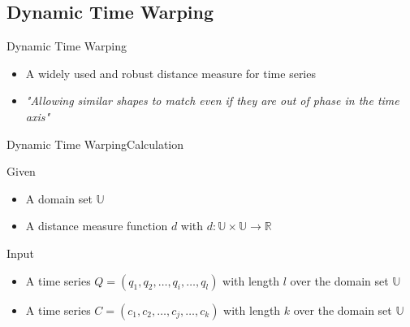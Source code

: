 \subsection{Dynamic Time Warping}

\begin{frame}{Dynamic Time Warping}
    \begin{itemize}
        \item A widely used and robust distance measure for time series
        \pause
        \item \textit{"Allowing similar shapes to match even if they are out of phase in the time axis"}
            \cite{keogh2002exact}
    \end{itemize}
\end{frame}

\begin{frame}{Dynamic Time Warping}{Calculation}
    \begin{block}{Given}
        \begin{itemize}
            \item A domain set $\mathbb{U}$
            \pause
            \item A distance measure function $d$ with $d: \mathbb{U} \times \mathbb{U} \to \mathbb{R}$
            \pause
        \end{itemize}
    \end{block}
    \begin{block}{Input}
        \begin{itemize}
            \item A time series $Q = (q_1, q_2, \dots, q_i, \dots, q_l)$ with length $l$ over the domain set
                $\mathbb{U}$
            \pause
            \item A time series $C = (c_1, c_2, \dots, c_j, \dots, c_k)$ with length $k$ over the domain set
                $\mathbb{U}$
        \end{itemize}
    \end{block}
\end{frame}

